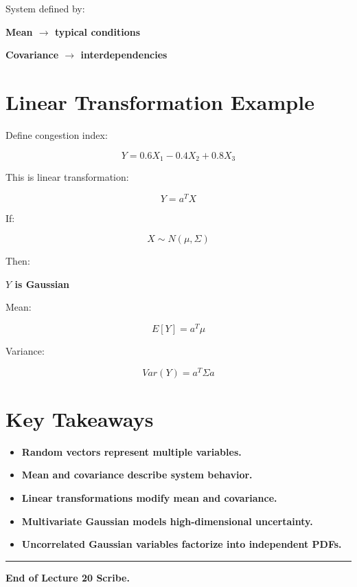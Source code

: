 \documentclass[12pt]{article}
\begin{document}
System defined by:

\textbf{Mean $\rightarrow$ typical conditions}

\textbf{Covariance $\rightarrow$ interdependencies}

\section{Linear Transformation Example}

Define congestion index:

\[
\boxed{Y = 0.6X_1 - 0.4X_2 + 0.8X_3}
\]

This is linear transformation:

\[
\boxed{Y = a^T X}
\]

If:

\[
X \sim N(\mu, \Sigma)
\]

Then:

\textbf{$Y$ is Gaussian}

Mean:

\[
\boxed{E[Y] = a^T \mu}
\]

Variance:

\[
\boxed{Var(Y) = a^T \Sigma a}
\]

\section{Key Takeaways}

\begin{itemize}
\item \textbf{Random vectors represent multiple variables.}
\item \textbf{Mean and covariance describe system behavior.}
\item \textbf{Linear transformations modify mean and covariance.}
\item \textbf{Multivariate Gaussian models high-dimensional uncertainty.}
\item \textbf{Uncorrelated Gaussian variables factorize into independent PDFs.}
\end{itemize}

\hrule
\vspace{0.5cm}

\textbf{End of Lecture 20 Scribe.}
\end{document}
